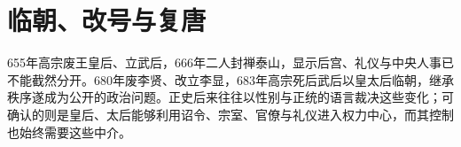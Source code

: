 \section{临朝、改号与复唐} \label{sec:empress-wu-zhou}  655年高宗废王皇后、立武后，666年二人封禅泰山，显示后宫、礼仪与中央人事已不能截然分开。680年废李贤、改立李显，683年高宗死后武后以皇太后临朝，继承秩序遂成为公开的政治问题。正史后来往往以性别与正统的语言裁决这些变化；可确认的则是皇后、太后能够利用诏令、宗室、官僚与礼仪进入权力中心，而其控制也始终需要这些中介。%